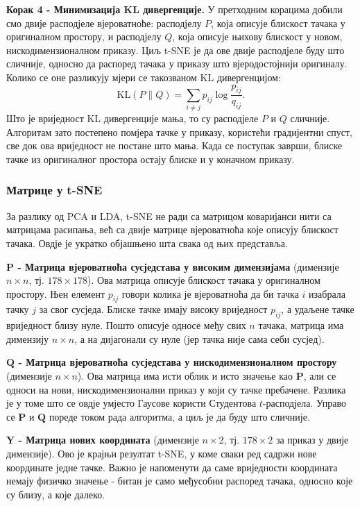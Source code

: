 \documentclass{article}
\begin{document}
	\textbf{Корак 4 - Минимизација KL дивергенције.} У претходним корацима добили смо двије расподјеле вјероватноће: расподјелу $P$, која описује блискост тачака у оригиналном простору, и расподјелу $Q$, која описује њихову блискост у новом, нискодимензионалном приказу. Циљ t-SNE је да ове двије расподјеле буду што сличније, односно да распоред тачака у приказу што вјеродостојнији оригиналу. Колико се оне разликују мјери се такозваном KL дивергенцијом:
	\begin{equation} \label{eq:tsne_kl}
		\text{KL}(P \| Q) = \sum_{i \neq j} p_{ij} \log\frac{p_{ij}}{q_{ij}}.
	\end{equation}
	Што је вриједност KL дивергенције мања, то су расподјеле $P$ и $Q$ сличније. Алгоритам зато постепено помјера тачке у приказу, користећи градијентни спуст, све док ова вриједност не постане што мања. Када се поступак заврши, блиске тачке из оригиналног простора остају блиске и у коначном приказу.
	
	
	\subsubsection{Матрице у t-SNE}
	
	За разлику од PCA и LDA, t-SNE не ради са матрицом коваријанси нити са матрицама расипања, већ са двије матрице вјероватноћа које описују блискост тачака. Овдје је укратко објашњено шта свака од њих представља.
	
	\textbf{$\mathbf{P}$ - Матрица вјероватноћа сусједстава у високим димензијама} (димензије $n \times n$, тј. $178 \times 178$). Ова матрица описује блискост тачака у оригиналном простору. Њен елемент $p_{ij}$ говори колика је вјероватноћа да би тачка $i$ изабрала тачку $j$ за свог сусједа. Блиске тачке имају високу вриједност $p_{ij}$, а удаљене тачке вриједност близу нуле. Пошто описује односе међу свих $n$ тачака, матрица има димензију $n \times n$, а на дијагонали су нуле (јер тачка није сама себи сусјед).
	
	\textbf{$\mathbf{Q}$ - Матрица вјероватноћа сусједстава у нискодимензионалном простору} (димензије $n \times n$). Ова матрица има исти облик и исто значење као $\mathbf{P}$, али се односи на нови, нискодимензионални приказ у који су тачке пребачене. Разлика је у томе што се овдје умјесто Гаусове користи Студентова $t$-расподјела. Управо се $\mathbf{P}$ и $\mathbf{Q}$ пореде током рада алгоритма, а циљ је да буду што сличније.
	
	\textbf{$\mathbf{Y}$ - Матрица нових координата} (димензије $n \times 2$, тј. $178 \times 2$ за приказ у двије димензије). Ово је крајњи резултат t-SNE, у коме сваки ред садржи нове координате једне тачке. Важно је напоменути да саме вриједности координата немају физичко значење - битан је само међусобни распоред тачака, односно које су близу, а које далеко.
	
\end{document}
